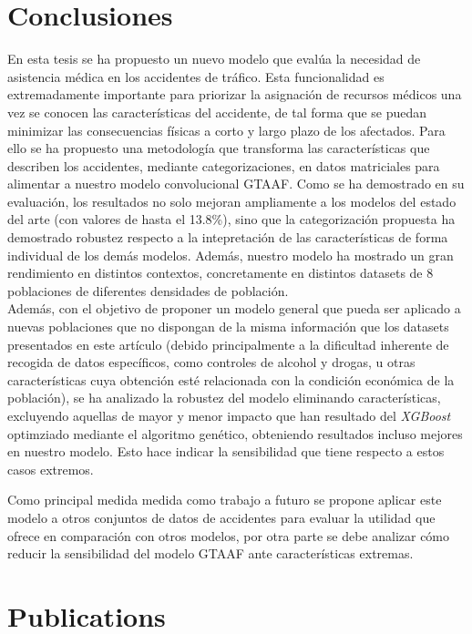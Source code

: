 \documentclass{uathesis-es}
\begin{document}
{\chapter{Conclusiones}


En esta tesis se ha propuesto un nuevo modelo que evalúa la necesidad de asistencia médica en los accidentes de tráfico. Esta funcionalidad es extremadamente importante para priorizar la asignación de recursos médicos una vez se conocen las características del accidente, de tal forma que se puedan minimizar las consecuencias físicas a corto y largo plazo de los afectados. Para ello se ha propuesto una metodología que transforma las características que describen los accidentes, mediante categorizaciones, en datos matriciales para alimentar a nuestro modelo convolucional GTAAF. Como se ha demostrado en su evaluación, los resultados no solo mejoran ampliamente a los modelos del estado del arte (con valores de hasta el 13.8\%), sino que la categorización propuesta ha demostrado robustez respecto a la intepretación de las características de forma individual de los demás modelos. Además, nuestro modelo ha mostrado un gran rendimiento en distintos contextos, concretamente en  distintos datasets de 8 poblaciones de diferentes densidades de población.\\

Además, con el objetivo de proponer un modelo general que pueda ser aplicado a nuevas poblaciones que no dispongan de la misma información que los datasets presentados en este artículo (debido principalmente a la dificultad inherente de recogida de datos específicos, como controles de alcohol y drogas, u otras características cuya obtención esté relacionada con la condición económica de la población), se ha analizado la robustez del modelo eliminando características, excluyendo aquellas de mayor y menor impacto que han resultado del \textit{XGBoost} optimziado mediante el algoritmo genético, obteniendo resultados incluso mejores en nuestro modelo. Esto hace indicar la sensibilidad que tiene respecto a estos casos extremos.

Como principal medida medida como trabajo a futuro se propone aplicar este modelo a otros conjuntos de datos de accidentes para evaluar la utilidad que ofrece en comparación con otros modelos, por otra parte se debe analizar cómo reducir la sensibilidad del modelo GTAAF ante características extremas.

\chapter{Publications}


}
\end{document}
